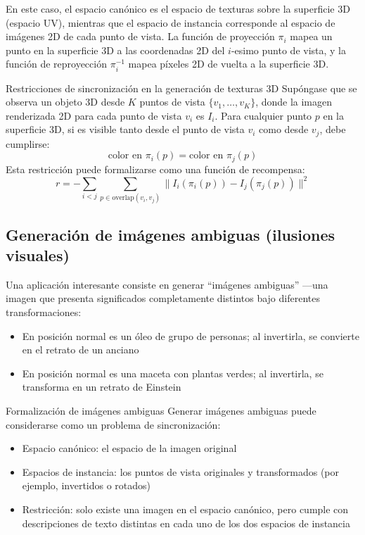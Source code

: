 En este caso, el espacio canónico es el espacio de texturas sobre la superficie 3D (espacio UV), mientras que el espacio de instancia corresponde al espacio de imágenes 2D de cada punto de vista. La función de proyección $\pi_i$ mapea un punto en la superficie 3D a las coordenadas 2D del $i$-esimo punto de vista, y la función de reproyección $\pi_i^{-1}$ mapea píxeles 2D de vuelta a la superficie 3D.

\begin{importantbox}{Restricciones de sincronización en la generación de texturas 3D}
Supóngase que se observa un objeto 3D desde $K$ puntos de vista $\{v_1, \ldots, v_K\}$, donde la imagen renderizada 2D para cada punto de vista $v_i$ es $I_i$. Para cualquier punto $p$ en la superficie 3D, si es visible tanto desde el punto de vista $v_i$ como desde $v_j$, debe cumplirse:
$$\text{color en } \pi_i(p) = \text{color en } \pi_j(p)$$
Esta restricción puede formalizarse como una función de recompensa:
$$r = -\sum_{i < j} \sum_{p \in \text{overlap}(v_i, v_j)} \| I_i(\pi_i(p)) - I_j(\pi_j(p)) \|^2$$
\end{importantbox}

\subsection{Generación de imágenes ambiguas (ilusiones visuales)}

Una aplicación interesante consiste en generar ``imágenes ambiguas'' —una imagen que presenta significados completamente distintos bajo diferentes transformaciones:
\begin{itemize}
    \item En posición normal es un óleo de grupo de personas; al invertirla, se convierte en el retrato de un anciano
    \item En posición normal es una maceta con plantas verdes; al invertirla, se transforma en un retrato de Einstein
\end{itemize}

\begin{knowledgebox}{Formalización de imágenes ambiguas}
Generar imágenes ambiguas puede considerarse como un problema de sincronización:
\begin{itemize}
    \item Espacio canónico: el espacio de la imagen original
    \item Espacios de instancia: los puntos de vista originales y transformados (por ejemplo, invertidos o rotados)
    \item Restricción: solo existe una imagen en el espacio canónico, pero cumple con descripciones de texto distintas en cada uno de los dos espacios de instancia
\end{itemize}
\end{knowledgebox}

